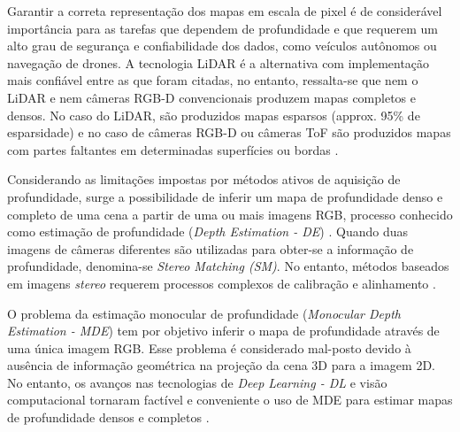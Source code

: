 

Garantir a correta representação dos mapas em escala de pixel é de considerável importância para as tarefas que dependem de profundidade e que requerem um alto grau de segurança e confiabilidade dos dados, como veículos autônomos ou navegação de drones. A tecnologia LiDAR é a alternativa com implementação mais confiável entre as que foram citadas, no entanto, ressalta-se que nem o LiDAR e nem câmeras RGB-D convencionais produzem mapas completos e densos. No caso do LiDAR, são produzidos mapas esparsos (approx. 95\% de esparsidade) e no caso de câmeras RGB-D ou câmeras ToF são produzidos mapas com partes faltantes em determinadas superfícies ou bordas \cite{hu2012robust}. 







Considerando as limitações impostas por métodos ativos de aquisição de profundidade, surge a possibilidade de inferir um mapa de profundidade denso e completo de uma cena a partir de uma ou mais imagens RGB, processo conhecido como estimação de profundidade (\textit{Depth Estimation - DE}) \cite{rajapaksha2024deep}. Quando duas imagens de câmeras diferentes são utilizadas para obter-se a informação de profundidade, denomina-se \textit{Stereo Matching (SM)}. No entanto, métodos baseados em imagens \textit{stereo} requerem processos complexos de calibração e alinhamento \cite{dong2022towards}.


O problema da estimação monocular de profundidade (\textit{Monocular Depth Estimation - MDE}) tem por objetivo inferir o mapa de profundidade através de uma única imagem RGB. Esse problema é considerado mal-posto devido à ausência de informação geométrica na projeção da cena 3D para a imagem 2D. No entanto, os avanços nas tecnologias de \textit{Deep Learning - DL} e visão computacional tornaram factível e conveniente o uso de MDE para estimar mapas de profundidade densos e completos \cite{spencer2024third} \cite{rajapaksha2024deep}. 

